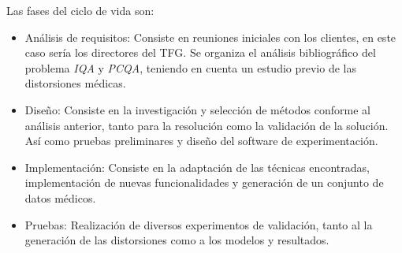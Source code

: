 Las fases del ciclo de vida son: 
\begin{itemize}
  \item Análisis de requisitos: Consiste en reuniones iniciales con los clientes, 
    en este caso sería los directores del TFG. Se organiza el análisis bibliográfico 
    del problema \emph{IQA} y \emph{PCQA}\footnotemark[4], teniendo en cuenta un estudio previo 
    de las distorsiones médicas.
  \item Diseño: Consiste en la investigación y selección de métodos conforme 
    al análisis anterior, tanto para la resolución como la validación de la solución. 
    Así como pruebas preliminares y diseño del software de experimentación. 
  \item Implementación: Consiste en la adaptación de las técnicas encontradas, 
    implementación de nuevas funcionalidades y generación de un conjunto de datos 
    médicos.
  \item Pruebas: Realización de diversos experimentos de validación, tanto al 
    la generación de las distorsiones como a los modelos y resultados.
\end{itemize}
